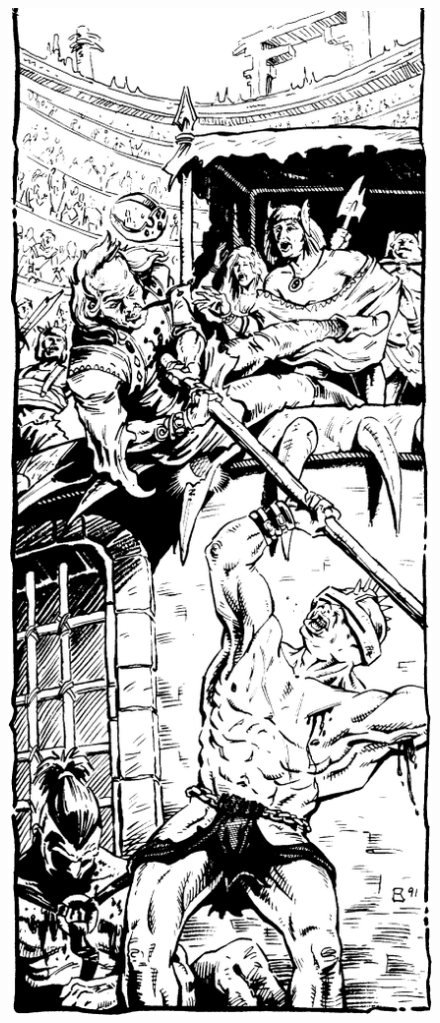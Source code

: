 \begin{figure}[t!]
\centering
\includegraphics[width=\columnwidth]{images/arena-2.png}
\end{figure}

